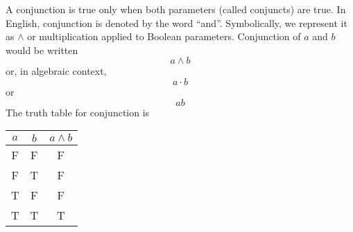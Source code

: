 \documentclass{article}
\begin{document}
A conjunction is true only when both parameters (called conjuncts) are true.  In English, conjunction is denoted by the word ``and''.  Symbolically, we represent it as $\land$ or multiplication applied to Boolean parameters.  Conjunction of $a$ and $b$ would be written $$a \land b$$ or, in algebraic context, $$ a \cdot b $$ or $$ ab $$  The truth table for conjunction is 

\begin{center}
\begin{tabular}{ccc}
$a$ & $b$ & $a \land b$ \\
\hline
F & F & F \\
F & T & F \\
T & F & F \\
T & T & T
\end{tabular}
\end{center}
\end{document}
